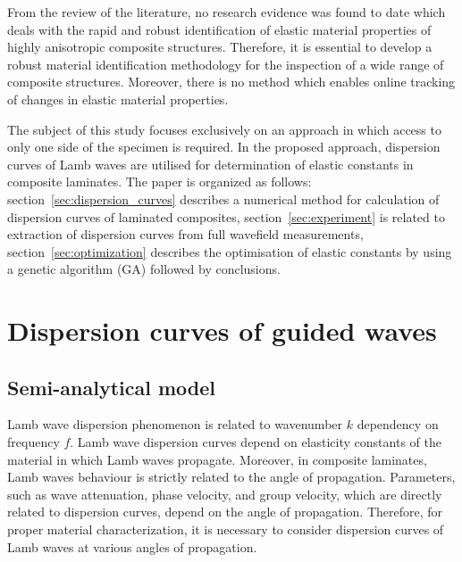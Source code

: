 	From the review of the literature, no research evidence was found to date which deals with the rapid and robust identification of elastic material properties of highly anisotropic composite structures. Therefore, it is essential to develop a robust material identification methodology for the inspection of a wide range of composite structures. Moreover, there is no method which enables online tracking of changes in elastic material properties.
	
	The subject of this study focuses exclusively on an approach in which access to only one side of the specimen is required. In the proposed approach, dispersion curves of Lamb waves are utilised for determination of elastic constants in composite laminates. The paper is organized as follows: section~\ref{sec:dispersion_curves} describes a numerical method for calculation of dispersion curves of laminated composites, section~\ref{sec:experiment} is related to extraction of dispersion curves from full wavefield measurements, section~\ref{sec:optimization} describes the optimisation of elastic constants by using a genetic algorithm (GA) followed by conclusions.
	
	

\section{Dispersion curves of guided waves \label{sec:dispersion_curves}}
	
\subsection{Semi-analytical model}
	Lamb wave dispersion phenomenon is related to wavenumber  \(k\) dependency on 
	frequency \(f\). Lamb wave dispersion curves depend on elasticity constants of the 
	material in which Lamb waves propagate. Moreover, in composite laminates, Lamb 
	waves behaviour is strictly related to the angle of propagation. Parameters, such as 
	wave attenuation, phase velocity, and group velocity, which are directly related to 
	dispersion curves, depend on the angle of propagation. Therefore, for proper material 
	characterization, it is necessary to consider dispersion curves of Lamb waves at 
	various angles of propagation.
	
